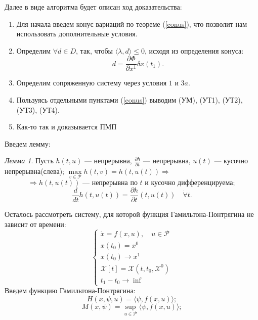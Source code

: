 \documentclass[oneside, final, 14pt, draft]{article}
\theoremstyle{definition}
\theoremstyle{definition}
\theoremstyle{remark}
\theoremstyle{theorem}
\newtheorem{lem}{Лемма}[section]
\renewcommand{\leq}{\leqslant}
\begin{document}
{\flushleft Далее в виде алгоритма будет описан ход доказательства:}
\begin{enumerate}
            \item Для начала введем конус вариаций по теореме (\ref{conus}), что позволит нам использовать дополнительные условия.
            \item Определим $\forall d \in D$, так, чтобы $\langle \lambda, d \rangle \leq 0$, исходя из определения конуса: $$d = \frac{\partial \Phi}{\partial x^1} \delta x(t_1). $$
            \item Определим сопряженную систему через условия $\mathit{1}$ и $\mathit{3a}$.
            \item Пользуясь отдельными пунктами (\ref{conus}) выводим (УМ), (УТ1), (УТ2), (УТ3), (УТ4).
            \item Как-то так и доказывается ПМП
\end{enumerate}
Введем лемму:
\begin{lem}
Пусть $h(t, u)$ --- непрерывна, $\frac{\partial h}{\partial t}$ --- непрерывна, $u(t)$ --- кусочно непрерывна(слева); $\max\limits_{v \in \mathcal{P}} h(t, v) = h(t, u(t)) \Rightarrow$
$$
\Rightarrow h(t, u(t)) \text{ --- непрерывна по } t \text{ и кусочно дифференцируема};
$$
$$
\frac{d}{dt} h(t, u(t)) = \frac{\partial h}{\partial t}(t, u(t)) \quad \dot{\forall} t.
$$
\end{lem}
Осталось рассмотреть систему, для которой функция Гамильтона-Понтрягина не зависит от времени:
\begin{equation*}
\begin{cases}
\dot{x} = f(x, u), \quad u \in \mathcal{P}\\
x(t_0) = x^0\\
x(t_0) \rightarrow x^1\\
\mathcal{X}[t] = \mathcal{X}(t, t_0, \mathcal{X}^0)\\
t_1- t_0 \rightarrow \inf\
\end{cases}
\end{equation*}
Введем функцию Гамильтона-Понтрягина:
$$
H(x, \psi, u) = \langle \psi, f(x, u) \rangle;
$$
$$
M(x, \psi) = \sup\limits_{u \in \mathcal{P}}\langle \psi, f(x, u) \rangle;
$$
\end{document}
